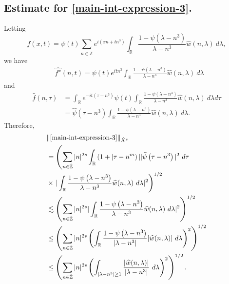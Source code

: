 \documentclass[12pt,reqno]{amsart}
\numberwithin{equation}{section}  %
\numberwithin{figure}{section}
\newcommand{\rr}{\mathbb{R}}
\newcommand{\zz}{\mathbb{Z}}
\newcommand{\zzdot}{\dot{\zz}}
\newcommand{\wh}{\widehat}
\theoremstyle{plain}
\theoremstyle{definition}
\theoremstyle{remark}
\begin{document}
\subsection{Estimate for \eqref{main-int-expression-3}.}
Letting $$f(x,t) = \psi(t) \sum_{n \in \zzdot} e^{i\left( xn + tn^{3} \right)} 
\int_\rr \frac{1 - \psi\left( \lambda - n^{3} \right)}{\lambda - n^{3}} 
\wh{w} \left( n, \lambda \right) \ d \lambda,$$ we have
%
%
\begin{equation*}
	\begin{split}
		& \wh{f^x}(n, t) = \psi(t) e^{itn^{3}} \int_\rr
		\frac{1 - \psi\left( \lambda - n^{3} \right)}{\lambda - n^{3}} 
		\wh{w}(n, \lambda) \ d \lambda
	\end{split}
\end{equation*}
and
\begin{equation*}
	\begin{split}
		 \wh{f}\left( n, \tau \right)
		 & = \int_\rr e^{-it\left( \tau - n^{3} 
		\right)} \psi(t) \int_\rr \frac{1 - \psi\left( 
		\lambda - n^{3} 
		\right)}{\lambda - n^{3}} \wh{w}(n, \lambda) \ d \lambda d \tau
		\\
		& = \wh{\psi}\left( \tau - n^{3} \right) \int_\rr 
		\frac{1 - \psi\left( 
		\lambda - n^{3} 
		\right)}{\lambda - n^{3}} \wh{w}(n, \lambda) \ d \lambda.
	\end{split}
\end{equation*}
Therefore,
%
%
\begin{equation*}
	\begin{split}
		& \| \eqref{main-int-expression-3} \|_{\dot{X}^s} 
		\\
		& = \left( \sum_{n \in \zzdot} |n|^{2s} \int_\rr \left( 1 + | \tau - n^{m
		} \right ) | | \wh{\psi}\left( \tau - n^3 \right) |^2 \ d \tau
		\right.
		\\
		& \times \left . |
		\int_\rr \frac{1 - \psi\left( \lambda - n^3 \right)}{\lambda -
		n^3} \wh{w}(n, \lambda) \ d \lambda |^2  \right)^{1/2}
		\\
		& \lesssim \left( \sum_{n \in \zzdot} |n|^{2s} | \int_\rr
		\frac{1 - \psi\left( \lambda - n^3 \right)}{\lambda - n^3}
		\wh{w}(n, \lambda) \ d\lambda |^2 \right)^{1/2}
		\\
		& \le \left( \sum_{n \in \zzdot} |n|^{2s}  \left ( \int_\rr
		\frac{1 - \psi\left( \lambda - n^3 \right)}{|\lambda - n^3|}
		|\wh{w}(n, \lambda) | \ d\lambda \right )^2 \right)^{1/2}
		\\
		& \le \left( \sum_{n \in \zzdot} |n|^{2s}  \left ( \int_{| \lambda - 
		n^3 | \ge 1}
		\frac{|\wh{w}(n, \lambda) | }{|\lambda - n^3|}
		\ d\lambda \right )^2 \right)^{1/2}.
	\end{split}
\end{equation*}
\end{document}
